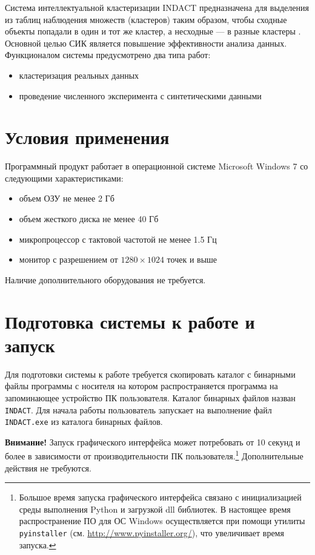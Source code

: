 \documentclass[12pt]{instruction}
\begin{document}
Система интеллектуальной кластеризации INDACT предназначена для выделения из таблиц наблюдения множеств (кластеров) таким образом, чтобы сходные объекты попадали в один и тот же кластер, а несходные — в разные кластеры \cite{data-science}. Основной целью СИК является повышение эффективности анализа данных. Функционалом системы предусмотрено два типа работ:
\begin{itemize}
	\item кластеризация реальных данных
	\item проведение численного эксперимента с синтетическими данными
\end{itemize}

\section{Условия применения}

Программный продукт работает в операционной системе Microsoft Windows 7 со следующими характеристиками:
\begin{itemize}
	\item объем ОЗУ не менее 2 Гб
	\item объем жесткого диска не менее 40 Гб
	\item микропроцессор с тактовой частотой не менее 1.5 Гц
	\item монитор с разрешением от $1280 \times 1024$ точек и выше
\end{itemize}
	Наличие дополнительного оборудования не требуется. 
	
\section{Подготовка системы к работе и запуск}
Для подготовки системы к работе требуется скопировать каталог с бинарными файлы программы с носителя на котором распространяется программа на запоминающее устройство ПК пользователя.  Каталог бинарных файлов назван \texttt{INDACT}. Для начала работы пользователь запускает на выполнение файл \texttt{INDACT.exe} из каталога бинарных файлов. 

\textbf{Внимание!} Запуск графического интерфейса может  потребовать от 10 секунд и более в зависимости от производительности ПК пользователя.\footnote{Большое время запуска графического интерфейса связано с инициализацией среды выполнения Python и загрузкой dll библиотек. В настоящее время распространение ПО для ОС Windows осуществляется при помощи утилиты \texttt{pyinstaller} (см. \url{http://www.pyinstaller.org/}), что увеличивает время запуска.} Дополнительные действия не требуются.
\end{document}
